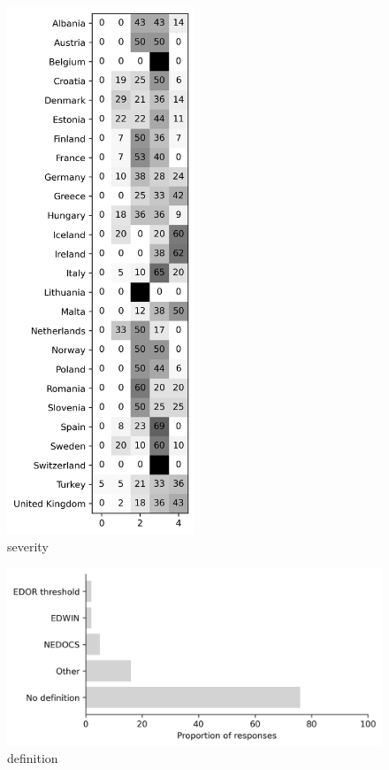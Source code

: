 \documentclass{article}
\begin{document}
\begin{figure}[H]
    \centering
        \includegraphics[width=0.5\textwidth]{../output/plots/severity}
        \caption{severity}
        \label{fig:severity}
\end{figure}

\begin{figure}[H]
    \centering
        \includegraphics[width=1.0\textwidth]{../output/plots/definition}
        \caption{definition}
        \label{fig:definition}
\end{figure}
\end{document}
